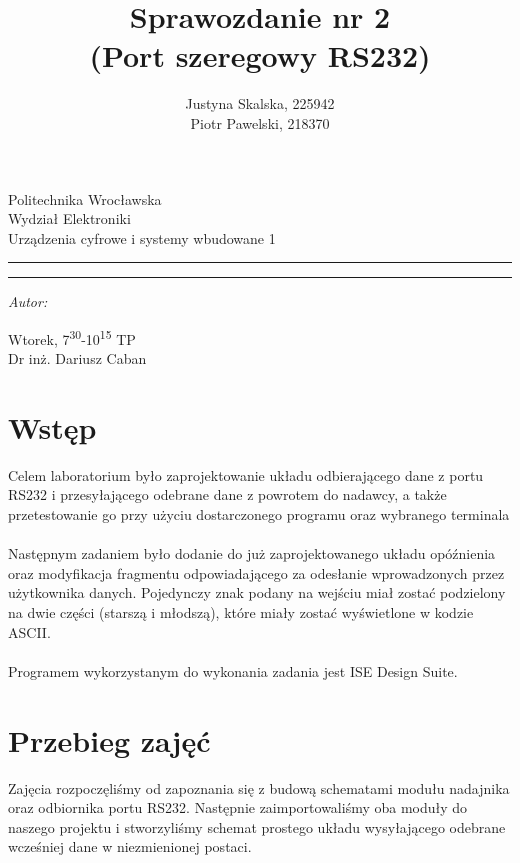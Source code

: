 \documentclass[12pt,a4paper,titlepage]{article}
\author{Justyna Skalska, 225942\\
        Piotr Pawelski, 218370}
\title{Sprawozdanie nr 2\\
\large(Port szeregowy RS232)}
\makeatletter
\newcommand{\linia}{\rule{\linewidth}{0.4mm}}
\renewcommand{\maketitle}{\begin{titlepage}
    \vspace*{1cm}
    \begin{center}\small
    Politechnika Wrocławska\\
    Wydział Elektroniki\\
    Urządzenia cyfrowe i systemy wbudowane 1
    \end{center}
    \vspace{3cm}
    \noindent\linia
    \begin{center}
      \LARGE \textsc{\@title}
         \end{center}
     \linia
    \vspace{0.5cm}
    \begin{flushright}
    \begin{minipage}{7cm}
    \textit{\small Autor:}\\
    \normalsize \textsc{\@author} \par
    \end{minipage}
    \vspace{5cm}

     {\small Wtorek, 7\textsuperscript{30}-10\textsuperscript{15} TP}\\
        Dr inż. Dariusz Caban
     \end{flushright}
    \vspace*{\stretch{6}}
    \begin{center}
    \@date
    \end{center}
  \end{titlepage}%
}
\makeatother
\begin{document}
\maketitle

\section{Wstęp}
Celem laboratorium było zaprojektowanie układu odbierającego dane z portu RS232 i przesyłającego odebrane dane z powrotem do nadawcy, a także przetestowanie go przy użyciu dostarczonego programu oraz wybranego terminala\\\\
Następnym zadaniem było dodanie do już zaprojektowanego układu opóźnienia oraz modyfikacja fragmentu odpowiadającego za odesłanie wprowadzonych przez użytkownika danych. Pojedynczy znak podany na wejściu miał zostać podzielony na dwie części (starszą i młodszą), które miały zostać wyświetlone w kodzie ASCII.\\\\
Programem wykorzystanym do wykonania zadania jest ISE Design Suite.

\section{Przebieg zajęć}
Zajęcia rozpoczęliśmy od zapoznania się z budową schematami modułu nadajnika oraz odbiornika portu RS232. Następnie zaimportowaliśmy oba moduły do naszego projektu i stworzyliśmy schemat prostego układu wysyłającego odebrane wcześniej dane w niezmienionej postaci.
\end{document}
